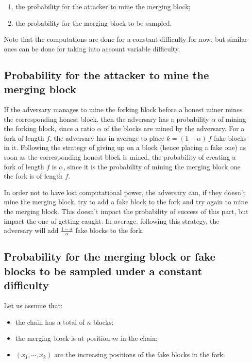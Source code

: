       \begin{enumerate}
      \item the probability for the attacker to mine the merging block;
      \item the probability for the merging block to be sampled.
      \end{enumerate}
      
      Note that the computations are done for a constant difficulty for now, but similar ones can be done for taking into account variable difficulty.
      
      \subsection{Probability for the attacker to mine the merging block}
        If the adversary manages to mine the forking block before a honest miner mines the corresponding honest block, then the adversary has a probability \(\alpha\) of mining the forking block, since a ratio \(\alpha\) of the blocks are mined by the adversary. For a fork of length \(f\), the adversary has in average to place \(k=(1-\alpha)\,f\) fake blocks in it. Following the strategy of giving up on a block (hence placing a fake one) as soon as the corresponding honest block is mined, the probability of creating a fork of length \(f\) is \(\alpha\), since it is the probability of mining the merging block one the fork is of length \(f\).
        
        In order not to have lost computational power, the adversary can, if they doesn't mine the merging block, try to add a fake block to the fork and try again to mine the merging block. This doesn't impact the probability of success of this part, but impact the one of getting caught. In average, following this strategy, the adversary will add \(\frac{1-\alpha}{\alpha}\) fake blocks to the fork.
      \subsection{Probability for the merging block or fake blocks to be sampled under a constant difficulty}
        Let us assume that:
        \begin{itemize}
          \item the chain has a total of \(n\) blocks;
          \item the merging block is at position \(m\) in the chain;
          \item \((x_1,\cdots,x_k)\) are the increasing positions of the fake blocks in the fork.
        \end{itemize}
        
